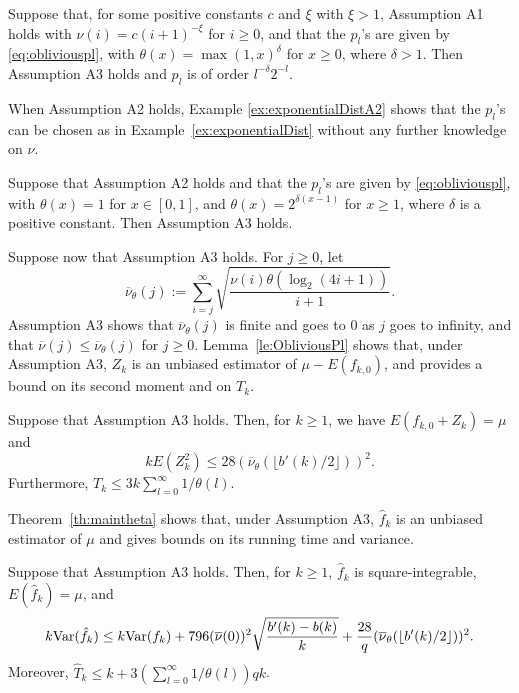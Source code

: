 \documentclass[a4paper,11pt]{article}
\begin{document}
\begin{example}\label{ex:thetaPowerExample} Suppose that, for some positive constants \(c\) and \(\xi\) with \( \xi>1\), Assumption A1 holds with \(\nu(i)= c(i+1)^{-\xi}\) for \(i\geq0\),    and that the \(p_{l}\)'s are given by \eqref{eq:obliviouspl},  with \(\theta(x)=\max(1,x)^{\delta}\) for \(x\geq0\), where \(\delta>1\).   Then Assumption A3 holds and \(p_{l}\) is of order \(l^{-\delta}2^{- l}\).\end{example}
When Assumption A2 holds, Example \ref{ex:exponentialDistA2} shows that the \(p_{l}\)'s can be chosen as in Example~\ref{ex:exponentialDist} without any further knowledge on \(\nu\). 
   

\begin{example} \label{ex:exponentialDistA2}Suppose that Assumption A2 holds  and that the \(p_{l}\)'s are given by \eqref{eq:obliviouspl},  with  
 \(\theta(x)=1\) for \(x\in[0,1]\), and \(\theta(x)=2^{\delta(x-1)}\) for \(x\geq1\), where \(\delta\)   is a positive constant. Then Assumption A3 holds.    \end{example}
Suppose now that Assumption A3 holds.   
For \(j\ge0\), let
\begin{equation*}
\overline{\nu}_{\theta}(j):=\sum^{\infty}_{i=j}\sqrt{\frac{\nu(i)\theta(\log_{2}(4i+1))}{i+1}}.
\end{equation*}
Assumption A3 shows that \(\overline{\nu}_{\theta}(j)\) is finite and goes to \(0\) as \(j\) goes to infinity, and that   \(\overline{\nu}(j)\le \overline{\nu}_{\theta}(j)\) for \(j\geq0\). 
Lemma~\ref{le:ObliviousPl} shows that, under Assumption A3, \(Z_{k}\) is an unbiased estimator of  \(\mu-E(f_{k,0})\), and provides  a bound on its  second moment and on \(T_{k}\).
\begin{lemma}\label{le:ObliviousPl} Suppose that Assumption A3  holds.  Then, for  \(k\geq1\), we have \(E(f_{k,0}+Z_{k})=\mu\) and \begin{equation}
\label{eq:ZNSecondMomentOblivious}
kE(Z_{k}^{2})\le28(\overline{\nu}_{\theta}(\lfloor{b'(k)}/{2}\rfloor))^{2}.
\end{equation}Furthermore, \(T_{k}\le3k\sum^{\infty}_{l=0}1/\theta(l)\).     
\end{lemma}
 Theorem~\ref{th:maintheta} shows that, under Assumption A3,  \(\hat f_{k}\) is an unbiased estimator of \(\mu\) and gives bounds on its running time and variance.   
\begin{theorem}\label{th:maintheta}
Suppose that Assumption A3  holds. Then, for \(k\ge1\), \(\hat f_{k}\) is square-integrable, \(E(\hat f_{k})=\mu\), and \begin{equation}\label{eq:varfHatkOblivious}
k{\rm Var}(\hat f_{k})\leq k{\rm Var}(f_{k})+796(\overline{\nu}(0))^{2}\sqrt{\frac{b'(k)-b(k)}{k}}+\frac{28}{q}(\overline{\nu}_{\theta}(\lfloor{b'(k)}/{2}\rfloor))^{2}.
\end{equation} Moreover, \(\hat T_{k}\le k+3(\sum^{\infty}_{l=0}1/\theta(l))qk\). \end{theorem}
\end{document}
